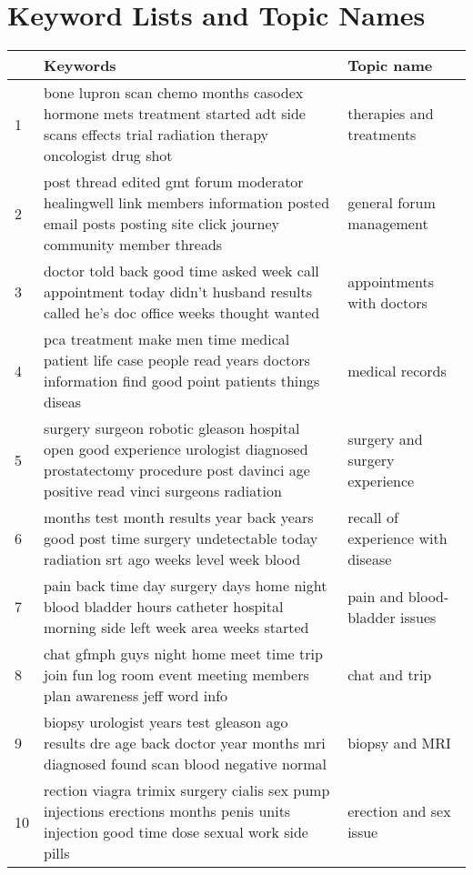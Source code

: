 \chapter{Keyword Lists and Topic Names} \label{appendix2}
\setlength{\LTleft}{-20cm plus -1fill}
\setlength{\LTright}{\LTleft}
\begin{longtable}[c]{| p{.10\linewidth} | p{.60\linewidth} | p{.30\linewidth} |} 
    \hline
     & \textbf{Keywords} & \textbf{Topic name} \\
    \hline
    \hline
    1 &  bone lupron scan chemo months casodex hormone mets treatment started adt side scans effects trial radiation therapy oncologist drug shot & therapies and treatments \\
    \hline
    2 &  post thread edited gmt forum moderator healingwell link members information posted email posts posting site click journey community member threads & general forum management \\
    \hline
    3 &  doctor told back good time asked week call appointment today didn't husband results called he's doc office weeks thought wanted & appointments with doctors \\
    \hline
    4 &  pca treatment make men time medical patient life case people read years doctors information find good point patients things diseas & medical records  \\
    \hline
    5 &  surgery surgeon robotic gleason hospital open  good experience urologist diagnosed prostatectomy procedure post davinci age positive read vinci surgeons radiation  & surgery and surgery experience \\
    \hline
    6 &  months test month results year back years good post time surgery undetectable today radiation srt ago weeks level week blood & recall of experience with disease \\
    \hline
    7 &  pain back time day surgery days home night blood bladder hours catheter hospital morning side left week area weeks started & pain and blood-bladder issues \\
    \hline
    8 &  chat gfmph guys night home meet time trip join fun log room event meeting members plan awareness jeff word info & chat and trip \\
    \hline
    9 &  biopsy urologist years test gleason ago results dre age back doctor year months mri diagnosed found  scan blood negative normal & biopsy and MRI \\
    \hline
    10 &  rection viagra trimix surgery cialis sex pump injections erections months penis units injection good time dose sexual work side pills & erection and sex issue \\

\end{longtable}
